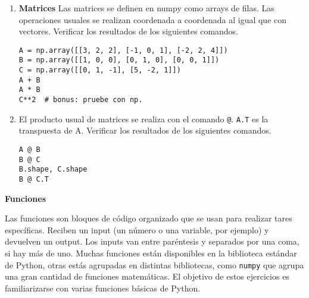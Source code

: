 \documentclass[a4paper,11pt]{article}
\theoremstyle{definition}
\begin{document}
\begin{enumerate}
\item \textbf{Matrices} Las matrices se definen en numpy como arrays de filas. Las operaciones usuales se realizan coordenada a coordenada al igual que con vectores.
Verificar los resultados de los siguientes comandos.

\begin{lstlisting}
A = np.array([[3, 2, 2], [-1, 0, 1], [-2, 2, 4]])
B = np.array([[1, 0, 0], [0, 1, 0], [0, 0, 1]])
C = np.array([[0, 1, -1], [5, -2, 1]])
A + B
A * B
C**2  # bonus: pruebe con np.
\end{lstlisting}

\item El producto usual de matrices se realiza con el comando \lstinline{@}. \lstinline|A.T| es la transpuesta de A. Verificar los resultados de los siguientes comandos.
\begin{lstlisting}
A @ B
B @ C
B.shape, C.shape
B @ C.T
\end{lstlisting}

\end{enumerate}
\textbf{\large Funciones}

Las funciones son bloques de código organizado que se usan para realizar tares específicas. Reciben un input (un número o una variable, por ejemplo) y devuelven un output. Los inputs van entre paréntesis y separados por una coma, si hay más de uno. Muchas funciones están disponibles en la biblioteca estándar de Python, otras estás agrupadas en distintas bibliotecas, como \lstinline{numpy} que agrupa una gran cantidad de funciones matemáticas. El objetivo de estos ejercicios es familiarizarse con varias funciones básicas de Python.
\end{document}
